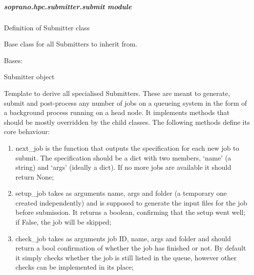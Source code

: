 \documentclass[letterpaper,10pt,english]{sphinxmanual}
\begin{document}
\begin{fulllineitems}
\begin{fulllineitems}
\end{fulllineitems}


\end{fulllineitems}



\subparagraph{soprano.hpc.submitter.submit module}
\label{doctree/soprano.hpc.submitter.submit:soprano-hpc-submitter-submit-module}\label{doctree/soprano.hpc.submitter.submit::doc}\label{doctree/soprano.hpc.submitter.submit:module-soprano.hpc.submitter.submit}
Definition of Submitter class

Base class for all Submitters to inherit from.

\begin{fulllineitems}
\label{doctree/soprano.hpc.submitter.submit:soprano.hpc.submitter.submit.Submitter}
Bases: 

Submitter object

Template to derive all specialised Submitters. These are meant to generate,
submit and post-process any number of jobs on a queueing system in the form
of a background process running on a head node. It implements
methods that should be mostly overridden by the child classes.
The following methods define its core behaviour:
\begin{enumerate}
\item {} 
next\_job is the function that outputs the specification for each new job
to submit. The specification should be a dict with two members, `name'
(a string) and `args' (ideally a dict). If no more jobs are available
it should return None;

\item {} 
setup\_job takes as arguments name, args and folder (a temporary one
created independently) and is supposed to generate the input files
for the job before submission. It returns a boolean, confirming that
the setup went well; if False, the job will be skipped;

\item {} 
check\_job takes as arguments job ID, name, args and folder and should
return a bool confirmation of whether the job has finished or not. By
default it simply checks whether the job is still listed in the queue,
however other checks can be implemented in its place;


\end{enumerate}
\end{fulllineitems}
\end{document}
